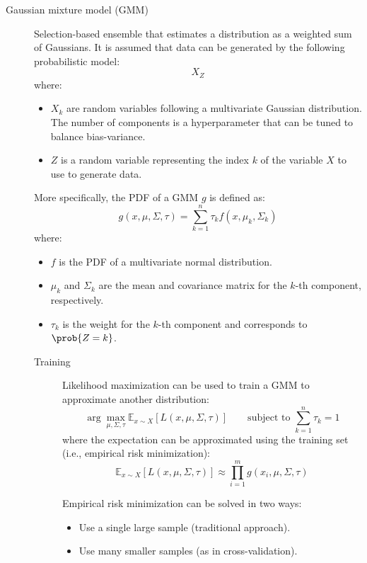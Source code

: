 \begin{description}
    \item[Gaussian mixture model (GMM)] 
        Selection-based ensemble that estimates a distribution as a weighted sum of Gaussians. It is assumed that data can be generated by the following probabilistic model:
        \[ X_Z \]
        where:
        \begin{itemize}
            \item $X_k$ are random variables following a multivariate Gaussian distribution. The number of components is a hyperparameter that can be tuned to balance bias-variance.

            \item $Z$ is a random variable representing the index $k$ of the variable $X$ to use to generate data.
        \end{itemize}

        More specifically, the PDF of a GMM $g$ is defined as:
        \[ g(x, \mu, \Sigma, \tau) = \sum_{k=1}^{n} \tau_k f(x, \mu_k, \Sigma_k) \]
        where:
        \begin{itemize}
            \item $f$ is the PDF of a multivariate normal distribution.
            \item $\mu_k$ and $\Sigma_k$ are the mean and covariance matrix for the $k$-th component, respectively.
            \item $\tau_k$ is the weight for the $k$-th component and corresponds to $\prob{Z=k}$.
        \end{itemize}

        \begin{description}
            \item[Training]
                Likelihood maximization can be used to train a GMM to approximate another distribution:
                \[ \arg\max_{\mu, \Sigma, \tau} \mathbb{E}_{x \sim X} \left[ L(x, \mu, \Sigma, \tau) \right] \qquad \text{subject to } \sum_{k=1}^{n} \tau_k = 1 \]
                where the expectation can be approximated using the training set (i.e., empirical risk minimization):
                \[ \mathbb{E}_{x \sim X} \left[ L(x, \mu, \Sigma, \tau) \right] \approx \prod_{i=1}^{m} g(x_i, \mu, \Sigma, \tau) \]

                \begin{remark}
                    Empirical risk minimization can be solved in two ways:
                    \begin{itemize}
                        \item Use a single large sample (traditional approach).
                        \item Use many smaller samples (as in cross-validation).
                    \end{itemize}
                \end{remark}


\end{description}
\end{description}
